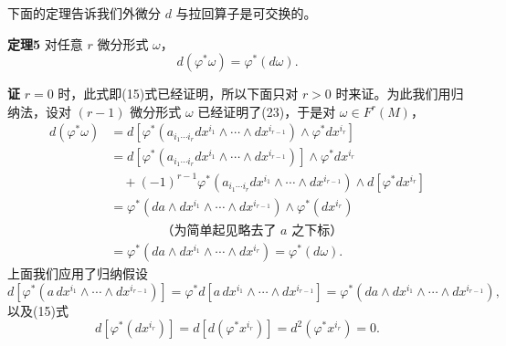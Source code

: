 下面的定理告诉我们外微分 $d$ 与拉回算子是可交换的。

\noindent\textbf{定理5}
对任意 $r$ 微分形式 $\omega$，
\begin{equation}
 d(\varphi^*\omega)=\varphi^*(d\omega).
 \tag{23}
\end{equation}

\noindent\textbf{证}
$r=0$ 时，此式即(15)式已经证明，所以下面只对 $r>0$ 时来证。为此我们用归纳法，设对 $(r-1)$ 微分形式 $\omega$ 已经证明了(23)，于是对 $\omega\in F^r(M)$，
\begin{align*}
 d(\varphi^*\omega)
 &=d\!\left[\varphi^*(a_{i_1\cdots i_r}dx^{i_1}\wedge\cdots\wedge dx^{i_{r-1}})\wedge\varphi^*dx^{i_r}\right]\\
 &=d\!\left[\varphi^*(a_{i_1\cdots i_r}dx^{i_1}\wedge\cdots\wedge dx^{i_{r-1}})\right]\wedge\varphi^*dx^{i_r}\\
 &\quad+(-1)^{r-1}\varphi^*(a_{i_1\cdots i_r}dx^{i_1}\wedge\cdots\wedge dx^{i_{r-1}})
 \wedge d[\varphi^*dx^{i_r}]\\
 &=\varphi^*(da\wedge dx^{i_1}\wedge\cdots\wedge dx^{i_{r-1}})\wedge\varphi^*(dx^{i_r})\\
 &\hspace{4em}\text{（为简单起见略去了 $a$ 之下标）}\\
 &=\varphi^*(da\wedge dx^{i_1}\wedge\cdots\wedge dx^{i_r})
 =\varphi^*(d\omega).
\end{align*}
上面我们应用了归纳假设
\[
 d[\varphi^*(a\,dx^{i_1}\wedge\cdots\wedge dx^{i_{r-1}})]
 =\varphi^*d[a\,dx^{i_1}\wedge\cdots\wedge dx^{i_{r-1}}]
 =\varphi^*(da\wedge dx^{i_1}\wedge\cdots\wedge dx^{i_{r-1}}),
\]
以及(15)式
\[
 d[\varphi^*(dx^{i_r})]=d[d(\varphi^*x^{i_r})]=d^2(\varphi^*x^{i_r})=0.
\]

